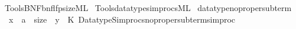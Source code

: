 \begin{isabellebody}
\isamarkupfalse%
\ {\isacartoucheopen}Tools{\isacharslash}{\kern0pt}BNF{\isacharslash}{\kern0pt}bnf{\isacharunderscore}{\kern0pt}lfp{\isacharunderscore}{\kern0pt}size{\isachardot}{\kern0pt}ML{\isacartoucheclose}\isanewline
\isanewline
{}\isamarkupfalse%
\ {\isacartoucheopen}Tools{\isacharslash}{\kern0pt}datatype{\isacharunderscore}{\kern0pt}simprocs{\isachardot}{\kern0pt}ML{\isacartoucheclose}\isanewline
\isanewline
{}\isamarkupfalse%
\ datatype{\isacharunderscore}{\kern0pt}no{\isacharunderscore}{\kern0pt}proper{\isacharunderscore}{\kern0pt}subterm\isanewline
\ \ {\isacharparenleft}{\kern0pt}{\isachardoublequoteopen}{\isacharparenleft}{\kern0pt}x\ {\isacharcolon}{\kern0pt}{\isacharcolon}{\kern0pt}\ {\isacharprime}{\kern0pt}a\ {\isacharcolon}{\kern0pt}{\isacharcolon}{\kern0pt}\ size{\isacharparenright}{\kern0pt}\ {\isacharequal}{\kern0pt}\ y{\isachardoublequoteclose}{\isacharparenright}{\kern0pt}\ {\isacharequal}{\kern0pt}\ {\isacartoucheopen}K\ Datatype{\isacharunderscore}{\kern0pt}Simprocs{\isachardot}{\kern0pt}no{\isacharunderscore}{\kern0pt}proper{\isacharunderscore}{\kern0pt}subterm{\isacharunderscore}{\kern0pt}simproc{\isacartoucheclose}%
\endisatagML
{\isafoldML}%
%
\isadelimML
\isanewline
%
\endisadelimML
%
\isadelimtheory
\isanewline
%
\endisadelimtheory
%
\isatagtheory
{}\isamarkupfalse%
%
\endisatagtheory
{\isafoldtheory}%
%
\isadelimtheory
%
\endisadelimtheory
%
\end{isabellebody}%
\endinput

